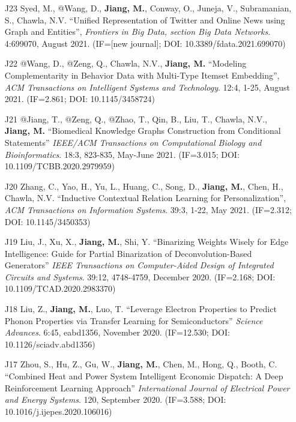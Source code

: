 \documentclass[10pt]{article}
\newenvironment{myindentpar}[1]%
{\begin{list}{}%
         {\setlength{\leftmargin}{#1}}%
         \item[]%
}
{\end{list}}
\newcounter{list}
\begin{document}
\begin{myindentpar}{0.00cm}
\begin{enumerate}[leftmargin=.5cm]
\item[J23] Syed, M., @Wang, D., \textbf{Jiang, M.}, Conway, O., Juneja, V., Subramanian, S., Chawla, N.V. ``Unified Representation of Twitter and Online News using Graph and Entities'', \textit{Frontiers in Big Data, section Big Data Networks}. 4:699070, August 2021. (IF=[new journal]; DOI: 10.3389/fdata.2021.699070)

\item[J22] @Wang, D., @Zeng, Q., Chawla, N.V., \textbf{Jiang, M.} ``Modeling Complementarity in Behavior Data with Multi-Type Itemset Embedding'', \textit{ACM Transactions on Intelligent Systems and Technology}. 12:4, 1-25, August 2021. (IF=2.861; DOI: 10.1145/3458724)

\item[J21] @Jiang, T., @Zeng, Q., @Zhao, T., Qin, B., Liu, T., Chawla, N.V., \textbf{Jiang, M.} ``Biomedical Knowledge Graphs Construction from Conditional Statements'' \textit{IEEE/ACM Transactions on Computational Biology and Bioinformatics}. 18:3, 823-835, May-June 2021. (IF=3.015; DOI: 10.1109/TCBB.2020.2979959)

\item[J20] Zhang, C., Yao, H., Yu, L., Huang, C., Song, D., \textbf{Jiang, M.}, Chen, H., Chawla, N.V. ``Inductive Contextual Relation Learning for Personalization'', \textit{ACM Transactions on Information Systems}. 39:3, 1-22, May 2021. (IF=2.312; DOI: 10.1145/3450353)

\item[J19] Liu, J., Xu, X., \textbf{Jiang, M.}, Shi, Y. ``Binarizing Weights Wisely for Edge Intelligence: Guide for Partial Binarization of Deconvolution-Based Generators'' \textit{IEEE Transactions on Computer-Aided Design of Integrated Circuits and Systems}. 39:12, 4748-4759, December 2020. (IF=2.168; DOI: 10.1109/TCAD.2020.2983370)

\item[J18] Liu, Z., \textbf{Jiang, M.}, Luo, T. ``Leverage Electron Properties to Predict Phonon Properties via Transfer Learning for Semiconductors'' \textit{Science Advances}. 6:45, eabd1356, November 2020. (IF=12.530; DOI: 10.1126/sciadv.abd1356)
	
\item[J17] Zhou, S., Hu, Z., Gu, W., \textbf{Jiang, M.}, Chen, M., Hong, Q., Booth, C. ``Combined Heat and Power System Intelligent Economic Dispatch: A Deep Reinforcement Learning Approach'' \textit{International Journal of Electrical Power and Energy Systems}. 120, September 2020. (IF=3.588; DOI: 10.1016/j.ijepes.2020.106016)


\end{enumerate}
\end{myindentpar}
\end{document}
